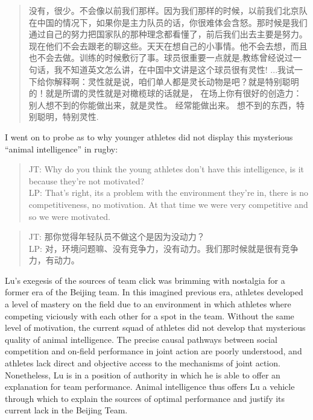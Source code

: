 \begin{CJK}{UTF8}{gbsn}
      \begin{quote}
        没有，很少。不会像以前我们那样。因为我们那样的时候，以前我们北京队在中国的情况下，如果你是主力队员的话，你很难体会含怒。那时候是我们通过自己的努力把国家队的那种理念都看懂了，前后我们出去主要是努力。现在他们不会去跟老的聊这些。天天在想自己的小事情。他不会去想，而且也不会去做。训练的时候敷衍了事。球员很重要一点就是,教练曾经说过一句话，我不知道英文怎么讲，在中国中文讲是这个球员很有灵性! ...我试一下给你解释啊：灵性就是说，咱们单人都是灵长动物是吧？就是特别聪明的！就是所谓的灵性就是对橄榄球的话就是， 在场上你有很好的创造力：别人想不到的你能做出来，就是灵性。 经常能做出来。 想不到的东西，特别聪明，特别灵性.
      \end{quote}

I went on to probe as to why younger athletes did not display this mysterious ``animal intelligence'' in rugby:

\begin{quote}
      JT: Why do you think the young athletes don't have this intelligence, is it because they're not motivated? \\
      LP: That's right, its a problem with the environment they're in, there is no competitiveness, no motivation.  At that time we were very competitive and so we were motivated.
\end{quote}

\begin{quote}
      JT: 那你觉得年轻队员不做这个是因为没动力？\\
      LP: 对，环境问题嘛、没有竞争力，没有动力。我们那时候就是很有竞争力，有动力。
\end{quote}

Lu's exegesis of the sources of team click was brimming with nostalgia for a former era of the Beijing team.  In this imagined previous era,  athletes developed a level of mastery on the field due to an environment in which athletes where competing viciously with each other for a spot in the team.  Without the same level of motivation, the current squad of athletes did not develop that mysterious quality of animal intelligence.  The precise causal pathways between social competition and on-field performance in joint action are poorly understood, and athletes lack direct and objective access to the mechanisms of joint action.  Nonetheless, Lu is in a position of authority in which he is able to offer an explanation for team performance.  Animal intelligence thus offers Lu a vehicle through which to explain the sources of optimal performance and justify its current lack in the Beijing Team.


\end{CJK}

